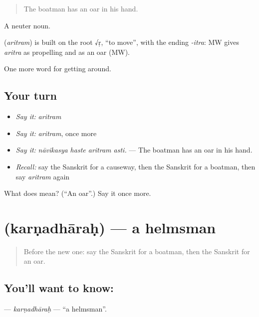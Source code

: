 \begin{quote}
The boatman has an oar in his hand.
\end{quote}

A neuter noun.

\begin{cousinweb}
\textbf{} (\emph{aritram}) is built on the root √ṛ, \textquotedblleft{}to move\textquotedblright{}, with the ending \emph{-itra}: MW gives \emph{aritra} as propelling and as an oar (MW).
\end{cousinweb}

\begin{grammarlens}[title={What you've built}]
One more word for getting around.
\end{grammarlens}

\subsection*{Your turn}
\begin{itemize}
\raggedright
  \item \emph{Say it:} \emph{aritram}
  \item \emph{Say it:} \emph{aritram}, once more
  \item \emph{Say it:} \emph{nāvikasya haste aritram asti.} — The boatman has an oar in his hand.
  \item \emph{Recall:} say the Sanskrit for a causeway, then the Sanskrit for a boatman, then say \emph{aritram} again
\end{itemize}

\begin{tcolorbox}[breakable,colback=teal!4,colframe=teal!35!black,title={Before you move on}]
What does  mean? (\textquotedblleft{}An oar\textquotedblright{}.) Say it once more.
\end{tcolorbox}
\section[\texorpdfstring{\sk{कर्णधारः} (karṇadhāraḥ)}{कर्णधारः (karṇadhāraḥ)}]{ (karṇadhāraḥ) — a helmsman}

\label{lesson:SA-C416-karnadharah}



\begin{quote}
Before the new one: say the Sanskrit for a boatman, then the Sanskrit for an oar.
\end{quote}

\subsection*{You'll want to know: }
\textbf{} — \emph{karṇadhāraḥ} — \textquotedblleft{}a helmsman\textquotedblright{}.

